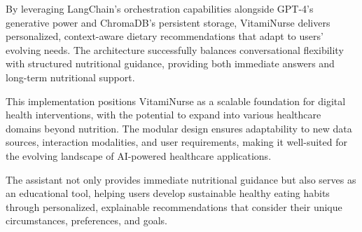 By leveraging LangChain's orchestration capabilities alongside GPT-4's generative power and ChromaDB's persistent storage, VitamiNurse delivers personalized, context-aware dietary recommendations that adapt to users' evolving needs. The architecture successfully balances conversational flexibility with structured nutritional guidance, providing both immediate answers and long-term nutritional support.

This implementation positions VitamiNurse as a scalable foundation for digital health interventions, with the potential to expand into various healthcare domains beyond nutrition. The modular design ensures adaptability to new data sources, interaction modalities, and user requirements, making it well-suited for the evolving landscape of AI-powered healthcare applications.

The assistant not only provides immediate nutritional guidance but also serves as an educational tool, helping users develop sustainable healthy eating habits through personalized, explainable recommendations that consider their unique circumstances, preferences, and goals.


